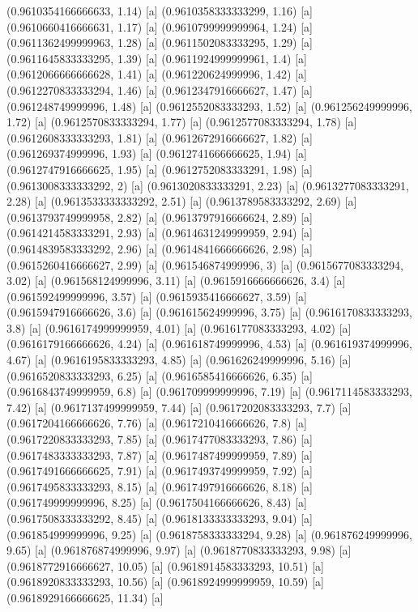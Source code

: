 {{{(0.9610354166666633, 1.14) [a] 
(0.9610358333333299, 1.16) [a] 
(0.9610660416666631, 1.17) [a] 
(0.9610799999999964, 1.24) [a] 
(0.9611362499999963, 1.28) [a] 
(0.9611502083333295, 1.29) [a] 
(0.9611645833333295, 1.39) [a] 
(0.9611924999999961, 1.4) [a] 
(0.9612066666666628, 1.41) [a] 
(0.961220624999996, 1.42) [a] 
(0.9612270833333294, 1.46) [a] 
(0.9612347916666627, 1.47) [a] 
(0.961248749999996, 1.48) [a] 
(0.9612552083333293, 1.52) [a] 
(0.961256249999996, 1.72) [a] 
(0.9612570833333294, 1.77) [a] 
(0.9612577083333294, 1.78) [a] 
(0.9612608333333293, 1.81) [a] 
(0.9612672916666627, 1.82) [a] 
(0.961269374999996, 1.93) [a] 
(0.9612741666666625, 1.94) [a] 
(0.9612747916666625, 1.95) [a] 
(0.9612752083333291, 1.98) [a] 
(0.9613008333333292, 2) [a] 
(0.9613020833333291, 2.23) [a] 
(0.9613277083333291, 2.28) [a] 
(0.9613533333333292, 2.51) [a] 
(0.9613789583333292, 2.69) [a] 
(0.9613793749999958, 2.82) [a] 
(0.9613797916666624, 2.89) [a] 
(0.9614214583333291, 2.93) [a] 
(0.9614631249999959, 2.94) [a] 
(0.9614839583333292, 2.96) [a] 
(0.9614841666666626, 2.98) [a] 
(0.9615260416666627, 2.99) [a] 
(0.961546874999996, 3) [a] 
(0.9615677083333294, 3.02) [a] 
(0.961568124999996, 3.11) [a] 
(0.9615916666666626, 3.4) [a] 
(0.961592499999996, 3.57) [a] 
(0.9615935416666627, 3.59) [a] 
(0.9615947916666626, 3.6) [a] 
(0.961615624999996, 3.75) [a] 
(0.9616170833333293, 3.8) [a] 
(0.9616174999999959, 4.01) [a] 
(0.9616177083333293, 4.02) [a] 
(0.9616179166666626, 4.24) [a] 
(0.961618749999996, 4.53) [a] 
(0.961619374999996, 4.67) [a] 
(0.9616195833333293, 4.85) [a] 
(0.961626249999996, 5.16) [a] 
(0.9616520833333293, 6.25) [a] 
(0.9616585416666626, 6.35) [a] 
(0.9616843749999959, 6.8) [a] 
(0.961709999999996, 7.19) [a] 
(0.9617114583333293, 7.42) [a] 
(0.9617137499999959, 7.44) [a] 
(0.9617202083333293, 7.7) [a] 
(0.9617204166666626, 7.76) [a] 
(0.9617210416666626, 7.8) [a] 
(0.9617220833333293, 7.85) [a] 
(0.9617477083333293, 7.86) [a] 
(0.9617483333333293, 7.87) [a] 
(0.9617487499999959, 7.89) [a] 
(0.9617491666666625, 7.91) [a] 
(0.9617493749999959, 7.92) [a] 
(0.9617495833333293, 8.15) [a] 
(0.9617497916666626, 8.18) [a] 
(0.961749999999996, 8.25) [a] 
(0.9617504166666626, 8.43) [a] 
(0.9617508333333292, 8.45) [a] 
(0.9618133333333293, 9.04) [a] 
(0.961854999999996, 9.25) [a] 
(0.9618758333333294, 9.28) [a] 
(0.961876249999996, 9.65) [a] 
(0.961876874999996, 9.97) [a] 
(0.9618770833333293, 9.98) [a] 
(0.9618772916666627, 10.05) [a] 
(0.9618914583333293, 10.51) [a] 
(0.9618920833333293, 10.56) [a] 
(0.9618924999999959, 10.59) [a] 
(0.9618929166666625, 11.34) [a] 
}}}
